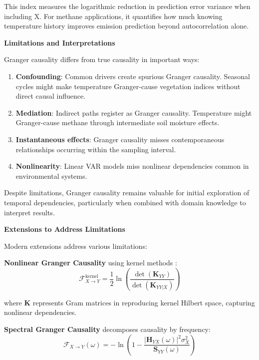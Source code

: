 This index measures the logarithmic reduction in prediction error variance when including X. For methane applications, it quantifies how much knowing temperature history improves emission prediction beyond autocorrelation alone.

\textbf{Limitations and Interpretations}

Granger causality differs from true causality in important ways:

\begin{enumerate}
\item \textbf{Confounding}: Common drivers create spurious Granger causality. Seasonal cycles might make temperature Granger-cause vegetation indices without direct causal influence.

\item \textbf{Mediation}: Indirect paths register as Granger causality. Temperature might Granger-cause methane through intermediate soil moisture effects.

\item \textbf{Instantaneous effects}: Granger causality misses contemporaneous relationships occurring within the sampling interval.

\item \textbf{Nonlinearity}: Linear VAR models miss nonlinear dependencies common in environmental systems.
\end{enumerate}

Despite limitations, Granger causality remains valuable for initial exploration of temporal dependencies, particularly when combined with domain knowledge to interpret results.

\textbf{Extensions to Address Limitations}

Modern extensions address various limitations:

\textbf{Nonlinear Granger Causality} using kernel methods \cite{Marinazzo2008}:
\begin{equation}
\mathcal{F}_{X \rightarrow Y}^{\text{kernel}} = \frac{1}{2}\ln\left(\frac{\det(\mathbf{K}_{YY})}{\det(\mathbf{K}_{YY|X})}\right)
\end{equation}

where $\mathbf{K}$ represents Gram matrices in reproducing kernel Hilbert space, capturing nonlinear dependencies.

\textbf{Spectral Granger Causality} decomposes causality by frequency:
\begin{equation}
\mathcal{F}_{X \rightarrow Y}(\omega) = -\ln\left(1 - \frac{|\mathbf{H}_{YX}(\omega)|^2 \sigma_X^2}{\mathbf{S}_{YY}(\omega)}\right)
\end{equation}

